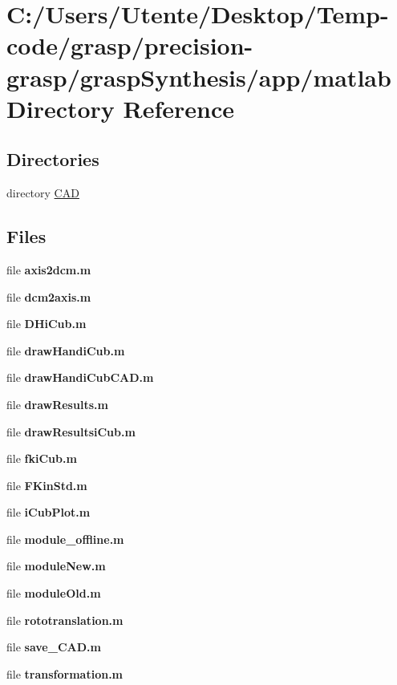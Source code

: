 \section{C\+:/\+Users/\+Utente/\+Desktop/\+Temp-\/code/grasp/precision-\/grasp/grasp\+Synthesis/app/matlab Directory Reference}
\label{dir_a103fce2cbc1c7bf88f5e82d806ee4ab}
\subsection*{Directories}
\begin{DoxyCompactItemize}
\item 
directory \hyperlink{dir_94821817937218410048e634088f096a}{C\+A\+D}
\end{DoxyCompactItemize}
\subsection*{Files}
\begin{DoxyCompactItemize}
\item 
file {\bfseries axis2dcm.\+m}
\item 
file {\bfseries dcm2axis.\+m}
\item 
file {\bfseries D\+Hi\+Cub.\+m}
\item 
file {\bfseries draw\+Handi\+Cub.\+m}
\item 
file {\bfseries draw\+Handi\+Cub\+C\+A\+D.\+m}
\item 
file {\bfseries draw\+Results.\+m}
\item 
file {\bfseries draw\+Resultsi\+Cub.\+m}
\item 
file {\bfseries fki\+Cub.\+m}
\item 
file {\bfseries F\+Kin\+Std.\+m}
\item 
file {\bfseries i\+Cub\+Plot.\+m}
\item 
file {\bfseries module\+\_\+offline.\+m}
\item 
file {\bfseries module\+New.\+m}
\item 
file {\bfseries module\+Old.\+m}
\item 
file {\bfseries rototranslation.\+m}
\item 
file {\bfseries save\+\_\+\+C\+A\+D.\+m}
\item 
file {\bfseries transformation.\+m}
\end{DoxyCompactItemize}
